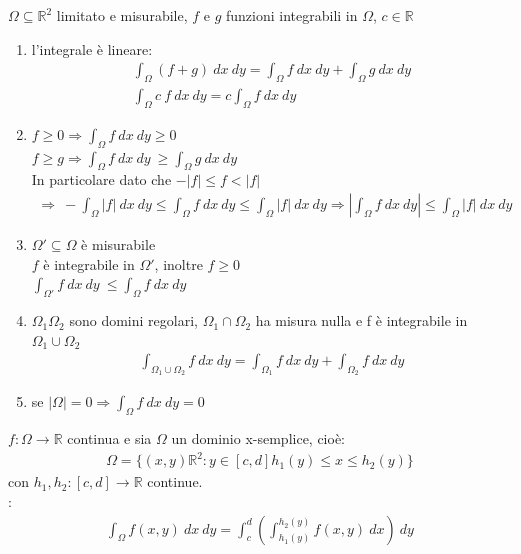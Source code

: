 \documentclass[a4paper, oneside]{article}
\begin{document}
\begin{proposition}
         $\Omega \subseteq \mathbb{R}^2$ limitato e misurabile, $f$ e $g$ funzioni integrabili in $\Omega$, $c \in \mathbb{R}$\\
    \begin{enumerate}[$a)$]
        \item l'integrale è lineare:
        \begin{gather*}
            \int_{\Omega} (f+g) \ dx \ dy = \int_{\Omega} f \ dx \ dy + \int_{\Omega} g \ dx \ dy\\
            \int_{\Omega} c \ f \ dx \ dy = c \int_{\Omega} f \ dx \ dy
        \end{gather*}
        \item {} $f\geq 0 \Rightarrow \int_{\Omega} f \ dx \ dy \geq 0$\\
         $f \geq g \Rightarrow \int_{\Omega} f \ dx \ dy \ \geq \int_{\Omega} g \ dx \ dy$\\
        In particolare dato che $-|f| \leq f < |f|$
        \begin{gather*}
            \Rightarrow \ -\int_{\Omega} |f| \ dx \ dy \leq \int_{\Omega} f \ dx \ dy \leq \int_{\Omega} |f| \ dx \ dy \Rightarrow \left| \int_{\Omega} f \ dx \ dy \right| \leq \int_{\Omega} |f| \ dx \ dy
        \end{gather*}
        \item {} $\Omega' \subseteq \Omega$ è misurabile \\
         $f$ è integrabile in $\Omega'$,  inoltre $f \geq 0$ \\
         $\int_{\Omega'} f \ dx \ dy \ \leq \int_{\Omega} f \ dx \ dy$
        \item{} $\Omega_1 \Omega_2$ sono domini regolari, $\Omega_1 \cap \Omega_2$ ha misura nulla e f è integrabile in $\Omega_1 \cup \Omega_2$\\
        \begin{gather*}
            \int_{\Omega_1 \cup \Omega_2} f \ dx \ dy = \int_{\Omega_1} f \ dx \ dy + \int_{\Omega_2} f \ dx \ dy
        \end{gather*}
        \item se $|\Omega| = 0 \Rightarrow \int_{\Omega} f \ dx \ dy = 0$
    \end{enumerate}
\end{proposition}
\begin{theorem}
     $f:\Omega \to \mathbb{R}$ continua e sia $\Omega$ un dominio x-semplice, cioè:
    \begin{gather*}
        \Omega = \{ (x,y) \mathbb{R}^2: y \in[c,d] h_1(y) \leq x \leq h_2(y)\}
    \end{gather*}
    con $h_1,h_2:[c,d] \to \mathbb{R}$ continue.\\
    :
    \begin{gather*}
        \int_{\Omega} f(x,y) \ dx \ dy = \int_{c}^{d} \left( \int_{h_1(y)}^{h_2(y)} f(x,y) \ dx \right) \ dy
    \end{gather*}
\end{theorem}
\end{document}
